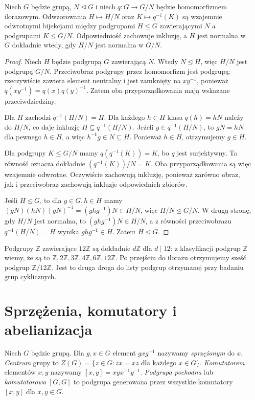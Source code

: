 \begin{twierdzenie}
\label{aa:tw:odpowiedniosc}
Niech $G$ będzie grupą, $N\trianglelefteq G$ i niech $q:G\to G/N$
będzie homomorfizmem ilorazowym. Odwzorowania
$H\mapsto H/N$ oraz $K\mapsto q^{-1}(K)$ są wzajemnie
odwrotnymi bijekcjami między podgrupami $H\le G$
zawierającymi $N$ a podgrupami $K\le G/N$.
Odpowiedniość zachowuje inkluzję, a $H$ jest normalna w $G$
dokładnie wtedy, gdy $H/N$ jest normalna w $G/N$.
\end{twierdzenie}
\begin{proof}
Niech $H$ będzie podgrupą $G$ zawierającą $N$.
Wtedy $N\trianglelefteq H$, więc $H/N$ jest podgrupą $G/N$.
Przeciwobraz podgrupy przez homomorfizm jest podgrupą:
rzeczywiście zawiera element neutralny i jest zamknięty
na $xy^{-1}$, ponieważ $q(xy^{-1})=q(x)q(y)^{-1}$.
Zatem oba przyporządkowania mają wskazane przeciwdziedziny.

Dla $H$ zachodzi $q^{-1}(H/N)=H$.
Dla każdego $h\in H$ klasa $q(h)=hN$ należy do $H/N$,
co daje inkluzję $H\subseteq q^{-1}(H/N)$.
Jeżeli $g\in q^{-1}(H/N)$, to $gN=hN$ dla pewnego $h\in H$,
a więc $h^{-1}g\in N\subseteq H$.
Ponieważ $h\in H$, otrzymujemy $g\in H$.

Dla podgrupy $K\le G/N$ mamy
$q(q^{-1}(K))=K$, bo $q$ jest surjektywny.
Ta równość oznacza dokładnie $(q^{-1}(K))/N=K$.
Oba przyporządkowania są więc wzajemnie odwrotne.
Oczywiście zachowują inkluzję, ponieważ zarówno obraz,
jak i przeciwobraz zachowują inkluzje odpowiednich zbiorów.

Jeśli $H\trianglelefteq G$, to dla $g\in G,h\in H$
mamy $(gN)(hN)(gN)^{-1}=(ghg^{-1})N\in H/N$,
więc $H/N\trianglelefteq G/N$.
W drugą stronę, gdy $H/N$ jest normalna, to
$(ghg^{-1})N\in H/N$, a z równości przeciwobrazu
$q^{-1}(H/N)=H$ wynika $ghg^{-1}\in H$.
Zatem $H\trianglelefteq G$.
\end{proof}

\begin{przyklad}
Podgrupy $\mathbb Z$ zawierające $12\mathbb Z$ są dokładnie
$d\mathbb Z$ dla $d\mid12$:
z klasyfikacji podgrup $\mathbb Z$ wiemy, że są to
$\mathbb Z,2\mathbb Z,3\mathbb Z,4\mathbb Z,6\mathbb Z,12\mathbb Z$.
Po przejściu do ilorazu otrzymujemy sześć podgrup
$\mathbb Z/12\mathbb Z$. Jest to druga droga do listy
podgrup otrzymanej przy badaniu grup cyklicznych.
\end{przyklad}

\section{Sprzężenia, komutatory i abelianizacja}
\begin{definicja}
Niech $G$ będzie grupą. Dla $g,x\in G$ element $gxg^{-1}$
nazywamy \emph{sprzężonym} do $x$. \emph{Centrum} grupy to
$Z(G)=\{z\in G:zx=xz\text{ dla każdego }x\in G\}$.
\emph{Komutatorem} elementów $x,y$ nazywamy
$[x,y]=xyx^{-1}y^{-1}$.
\emph{Podgrupa pochodna} lub \emph{komutatorowa}
$[G,G]$ to podgrupa generowana przez wszystkie komutatory
$[x,y]$ dla $x,y\in G$.
\end{definicja}

